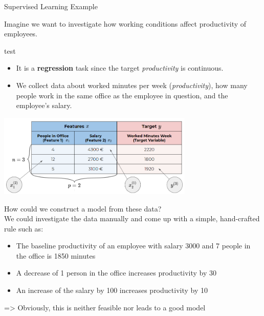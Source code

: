 \begin{vbframe}{Supervised Learning Example}

Imagine we want to investigate how working conditions affect productivity of employees.

test

\begin{itemize}
	\item It is a \textbf{regression} task since the target \emph{productivity} is continuous.
	\item We collect data about worked minutes
per week (\emph{productivity}), how many people work in the same office as the
employee in question, and the employee's salary.
\end{itemize}

\begin{center}
  \includegraphics[width = 0.7\textwidth]{figure_man/data_table}
\end{center}

\framebreak

How could we construct a model from these data?\\[1ex]

We could investigate the data manually and come up with a simple, hand-crafted rule such as:

	\begin{itemize}
		\item The baseline productivity of an employee with salary 3000 and 7 people in the office is 1850 minutes
		\item A decrease of 1 person in the office increases productivity by 30
		\item An increase of the salary by 100 increases productivity by 10
	\end{itemize}

=> Obviously, this is neither feasible nor leads to a good model
\end{vbframe}



